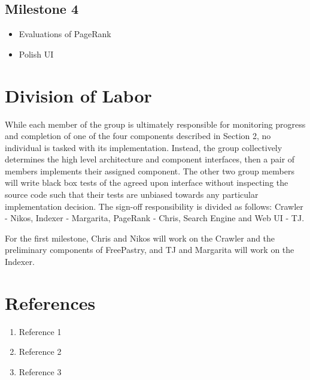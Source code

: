 \documentclass[11pt, twocolumn]{article}
\begin{document}
\subsection{Milestone 4}

\begin{itemize}
\item            Evaluations of PageRank
\item            Polish UI
\end{itemize}


\section{ Division of Labor }

While each member of the group is ultimately responsible for monitoring progress and completion of one of the four components described in Section 2, no individual is tasked with its implementation.  Instead, the group collectively determines the high level architecture and component interfaces, then a pair of members implements their assigned component.  The other two group members will write black box tests of the agreed upon interface without inspecting the source code such that their tests are unbiased towards any particular implementation decision. The sign-off responsibility is divided as follows: Crawler - Nikos, Indexer - Margarita, PageRank - Chris, Search Engine and Web UI - TJ.

For the first milestone, Chris and Nikos will work on the Crawler and the preliminary components of FreePastry, and TJ and Margarita will work on the Indexer.

\section{References}

\begin{enumerate}
\item Reference 1
\item Reference 2
\item Reference 3
\end{enumerate}
\end{document}
